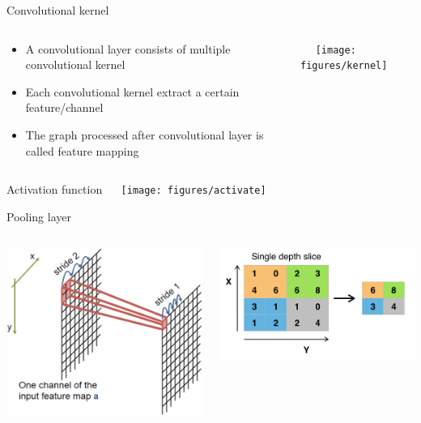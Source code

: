 \documentclass{beamer}
\begin{document}
\begin{CJK*}{UTF8}{gbsn}
\begin{frame}{Convolutional kernel}
\begin{columns}
\begin{column}{0.4\textwidth}
\begin{itemize}
\item A convolutional layer consists of multiple convolutional kernel 
\item Each convolutional kernel extract a certain feature/channel
\item The graph processed after convolutional layer is called feature mapping
\end{itemize}
\end{column}

\begin{column}{0.6\textwidth}
\centering  
\texttt{[image: figures/kernel]} 
\end{column}
\end{columns}
\end{frame}


\begin{frame}{Activation function}
\centering  
\texttt{[image: figures/activate]}
\end{frame}





\begin{frame}{Pooling layer}
\begin{columns}
\begin{column}{0.5\textwidth}
\begin{center}
\includegraphics[width=.6\textwidth, height=0.4\textheight]{figures/PoolingLayer1} 
\end{center}

\end{column}
\begin{column}{0.5\textwidth}	
\begin{center}
\includegraphics[width=.6\textwidth, height=0.4\textheight]{figures/PoolingLayer2}
\end{center}	


\end{column}
\end{columns}
\end{frame}
\end{CJK*}
\end{document}
